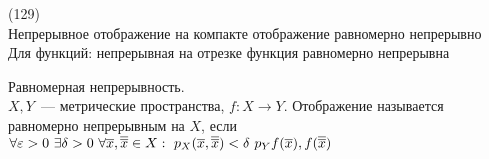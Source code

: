 (129)\\
Непрерывное отображение на компакте отображение равномерно непрерывно\\
Для функций: непрерывная на отрезке функция равномерно непрерывна

\q Равномерная непрерывность.\\
$X, Y$~--- метрические пространства, $f: X \to Y$. Отображение называется равномерно непрерывным на $X$, если\\
$\forall \varepsilon > 0\ \exists \delta > 0\ \forall \overline{x}, \overline{\overline{x}} \in X:\ p_X(\overline{x}, \overline{\overline{x}}) < \delta\ p_Y{f(\overline{x}), f(\overline{\overline{x}})}$